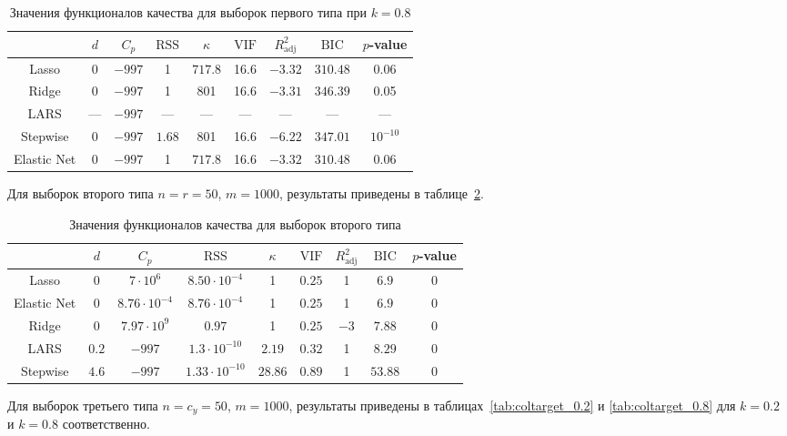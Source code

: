 \documentclass[a4paper,12pt]{article}
\newcommand{\vif}{\mathrm{VIF}}
\newcommand{\rss}{\mathrm{RSS}}
\newcommand{\bic}{\mathrm{BIC}}
\newcommand{\radj}{R_{\text{adj}}^2}
\theoremstyle{plain}
\begin{document}
\begin{table}[h]
\centering
\caption{Значения функционалов качества для выборок первого типа при $k = 0.8$}
\begin{tabular}{|c|c|c|c|c|c|c|c|c|}
\hline 
 & $d$ & $C_p$ & $\rss$ & $\kappa$ & $\vif$ & $\radj$ & $\bic$ & $p$-value \\ 
\hline 
Lasso & 0  &	$-997$ & 1 & $717.8$ & 16.6 & $-3.32$ & $310.48$ & 0.06 \\ 
\hline 
Ridge & 0 & $-997$ & 1 & 801 & 16.6 & $-3.31$ & $346.39$ & 0.05 \\ 
\hline 
LARS & --- & $-997$ & --- & --- & --- & --- & --- & --- \\ 
\hline 
Stepwise & 0 & $-997$ & $1.68$ & 801 & 16.6 & $-6.22$ & $347.01$ & $10^{-10}$ \\
\hline
Elastic Net & 0 & $-997$ & 1 & $717.8$ & 16.6 & $-3.32$ & $310.48$ & 0.06 \\
\hline
\end{tabular}
\label{tab:ortcol_0.8}
\end{table}
Для выборок второго типа $n = r = 50$, $m = 1000$, результаты приведены в таблице~\ref{tab:random}.
\begin{table}[h]
\centering
\caption{Значения функционалов качества для выборок второго типа}
\begin{tabular}{|c|c|c|c|c|c|c|c|c|}
\hline 
 & $d$ & $C_p$ & $\rss$ & $\kappa$ & $\vif$ & $\radj$ & $\bic$ & $p$-value \\ 
\hline 
Lasso & 0 & $7 \cdot 10^6$ & $8.50 \cdot 10^{-4}$ & 1 & $0.25$ & 1 & $6.9$  & 0 \\ 
\hline
Elastic Net & 0 & $8.76 \cdot 10^{-4}$ & $8.76 \cdot 10^{-4}$ & 1 & $0.25$ & 1 & $ 6.9 $ & 0 \\
\hline
Ridge & 0 & $7.97 \cdot 10^9$ & $0.97$ & 1 & $0.25$ & $-3$ & $ 7.88 $ & 0 \\ 
\hline
LARS & $0.2$ & $-997$ & $1.3 \cdot 10^{-10}$ & $2.19$  & $0.32$ & 1 & $8.29$ & 0 \\ 
\hline 
Stepwise & $4.6$ & $-997$ & $1.33\cdot 10^{-10}$ & $28.86$ & $0.89$ & 1 & $ 53.88$ & 0 \\
\hline  
\end{tabular}
\label{tab:random}
\end{table}
Для выборок третьего типа $n = c_y = 50$, $m = 1000$, результаты приведены в таблицах~\ref{tab:coltarget_0.2} и \ref{tab:coltarget_0.8} для $k = 0.2$ и $k = 0.8$ соответственно.  
\end{document}
